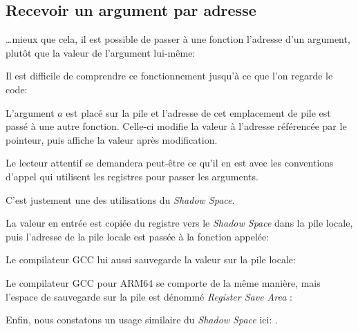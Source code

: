 ﻿\subsection{Recevoir un argument par adresse}
\label{pointer_to_argument}

\dots mieux que cela, il est possible de passer à une fonction l'adresse d'un argument, plutôt que 
la valeur de l'argument lui-même:



Il est difficile de comprendre ce fonctionnement jusqu'à ce que l'on regarde le code:



L'argument $a$ est placé sur la pile et l'adresse de cet emplacement de pile est passé à une autre
fonction. Celle-ci modifie la valeur à l'adresse référencée par le pointeur, puis \printf affiche 
la valeur après modification.

\par Le lecteur attentif se demandera peut-être ce qu'il en est avec les conventions d'appel qui 
utilisent les registres pour passer les arguments.

C'est justement une des utilisations du \emph{Shadow Space}.

La valeur en entrée est copiée du registre vers le \emph{Shadow Space} dans la pile locale, puis 
l'adresse de la pile locale est passée à la fonction appelée:



Le compilateur GCC lui aussi sauvegarde la valeur sur la pile locale:



Le compilateur GCC pour ARM64 se comporte de la même manière, mais l'espace de sauvegarde sur la pile 
est dénommé \emph{Register Save Area} :



Enfin, nous constatons un usage similaire du \emph{Shadow Space} ici: .


